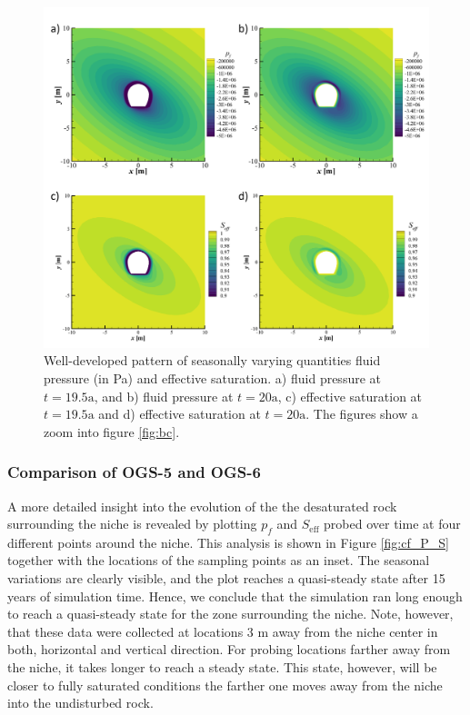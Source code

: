 \begin{figure}[t]
\includegraphics[width=\textwidth, trim=0.4cm 0.2cm 0.2cm 0, clip]{./figures/MEX10_results_pf_S.png}
\caption{Well-developed pattern of seasonally varying quantities fluid pressure (in Pa) and effective saturation. a) fluid pressure at $t=19.5\text{a}$, and b) fluid pressure at $t=20\text{a}$, c) effective saturation at $t = 19.5\text{a}$ and d) effective saturation at $t=20\text{a}$. The figures show a zoom into figure \ref{fig:bc}.}
\label{fig:results}
\end{figure}
%

\subsubsection{Comparison of OGS-5 and OGS-6}\label{sec:mex10_ogs5_vs_ogs6}

A more detailed insight into the evolution of the the desaturated rock surrounding the niche is revealed by plotting $p_f$ and $S_\text{eff}$ probed over time at four different points around the niche. This analysis is shown in Figure \ref{fig:cf_P_S} together with the locations of the sampling points as an inset. The seasonal variations are clearly visible, and the plot reaches a quasi-steady state after 15 years of simulation time. Hence, we conclude that the simulation ran long enough to reach a quasi-steady state for the zone surrounding the niche. Note, however, that these data were collected at locations 3 m away from the niche center in both, horizontal and vertical direction. For probing locations farther away from the niche, it takes longer  to reach a steady state. This state, however, will be closer to fully saturated conditions the farther one moves away from the niche into the undisturbed rock. 

